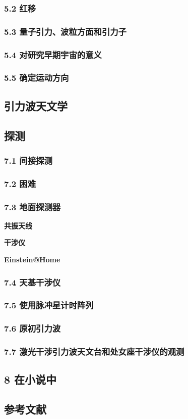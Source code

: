 \subsubsection{5.2 红移}

\subsubsection{5.3 量子引力、波粒方面和引力子}

\subsubsection{5.4 对研究早期宇宙的意义}

\subsubsection{5.5 确定运动方向}

\subsection{引力波天文学}

\subsection{探测}

\subsubsection{7.1 间接探测}

\subsubsection{7.2 困难}

\subsubsection{7.3 地面探测器}

\textbf{共振天线}

\textbf{干涉仪}

\textbf{Einstein@Home}

\subsubsection{7.4 天基干涉仪}

\subsubsection{7.5 使用脉冲星计时阵列}

\subsubsection{7.6 原初引力波}

\subsubsection{7.7 激光干涉引力波天文台和处女座干涉仪的观测}

\subsection{8 在小说中}

\subsection{参考文献}